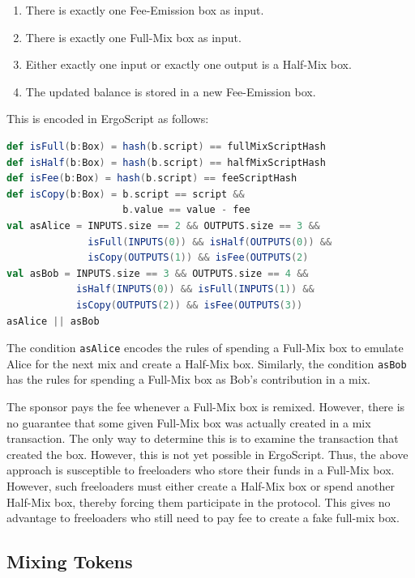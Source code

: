 \documentclass[runningheads]{llncs}
\newcommand{\langname}{ErgoScript\xspace}
\begin{document}
\begin{enumerate}
    \item There is exactly one Fee-Emission box as input.
    \item There is exactly one Full-Mix box as input.
    \item Either exactly one input or exactly one output is a Half-Mix box.
    \item The updated balance is stored in a new Fee-Emission box.
\end{enumerate}

This is encoded in \langname as follows:

\begin{lstlisting}[language=Scala,caption={Fee emission script},label=feeEmissionScript]
def isFull(b:Box) = hash(b.script) == fullMixScriptHash 
def isHalf(b:Box) = hash(b.script) == halfMixScriptHash
def isFee(b:Box) = hash(b.script) == feeScriptHash
def isCopy(b:Box) = b.script == script && 
                    b.value == value - fee
val asAlice = INPUTS.size == 2 && OUTPUTS.size == 3 &&
              isFull(INPUTS(0)) && isHalf(OUTPUTS(0)) &&
              isCopy(OUTPUTS(1)) && isFee(OUTPUTS(2)
val asBob = INPUTS.size == 3 && OUTPUTS.size == 4 &&
            isHalf(INPUTS(0)) && isFull(INPUTS(1)) &&
            isCopy(OUTPUTS(2)) && isFee(OUTPUTS(3))
asAlice || asBob 
\end{lstlisting}

The condition \texttt{asAlice} encodes the rules of spending a Full-Mix box to emulate Alice for the next mix and create a Half-Mix box. Similarly, the condition \texttt{asBob} has the rules for spending a Full-Mix box as Bob's contribution in a mix. 

The sponsor pays the fee whenever a Full-Mix box is remixed. However, there is no guarantee that some given Full-Mix box was actually created in a mix transaction. The only way to determine this is to examine the transaction that created the box. However, this is not yet possible in \langname. Thus, the above approach is susceptible to freeloaders who store their funds in a Full-Mix box. However, such freeloaders must either create a Half-Mix box or spend another Half-Mix box, thereby forcing them participate in the protocol. This gives no advantage to freeloaders who still need to pay fee to create a fake full-mix box. 

\subsection{Mixing Tokens}
\end{document}
